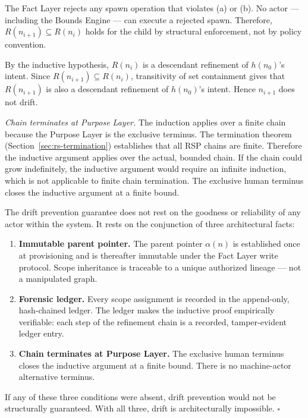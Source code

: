 The Fact Layer rejects any spawn operation that violates (a) or (b). No actor — including the Bounds Engine — can execute a rejected spawn. Therefore, $R(n_{i+1}) \subseteq R(n_i)$ holds for the child by structural enforcement, not by policy convention.

By the inductive hypothesis, $R(n_i)$ is a descendant refinement of $h(n_0)$'s intent. Since $R(n_{i+1}) \subseteq R(n_i)$, transitivity of set containment gives that $R(n_{i+1})$ is also a descendant refinement of $h(n_0)$'s intent. Hence $n_{i+1}$ does not drift.

\medskip
\noindent\textit{Chain terminates at Purpose Layer.} The induction applies over a finite chain because the Purpose Layer is the exclusive terminus. The termination theorem (Section~\ref{sec:rs-termination}) establishes that all RSP chains are finite. Therefore the inductive argument applies over the actual, bounded chain. If the chain could grow indefinitely, the inductive argument would require an infinite induction, which is not applicable to finite chain termination. The exclusive human terminus closes the inductive argument at a finite bound.

\medskip
The drift prevention guarantee does not rest on the goodness or reliability of any actor within the system. It rests on the conjunction of three architectural facts:

\begin{enumerate}
    \item[(1)] \textbf{Immutable parent pointer.} The parent pointer $\alpha(n)$ is established once at provisioning and is thereafter immutable under the Fact Layer write protocol. Scope inheritance is traceable to a unique authorized lineage — not a manipulated graph.
    \item[(2)] \textbf{Forensic ledger.} Every scope assignment is recorded in the append-only, hash-chained ledger. The ledger makes the inductive proof empirically verifiable: each step of the refinement chain is a recorded, tamper-evident ledger entry.
    \item[(3)] \textbf{Chain terminates at Purpose Layer.} The exclusive human terminus closes the inductive argument at a finite bound. There is no machine-actor alternative terminus.
\end{enumerate}

If any of these three conditions were absent, drift prevention would not be structurally guaranteed. With all three, drift is architecturally impossible. $\square$


